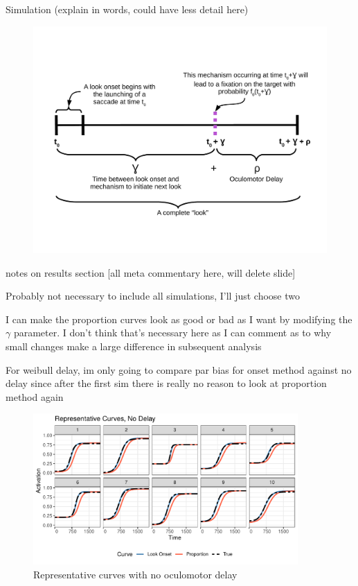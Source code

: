 \documentclass{beamer}
\newcommand{\vp}{\vspace{2mm}}
\begin{document}
\begin{frame}{Simulation (explain in words, could have less detail here)}

\vspace{-2.5mm}
\begin{figure}
\centering
\includegraphics[scale=0.4]{look_comp.pdf}
\end{figure}
\end{frame}

\begin{frame}{notes on results section}
[all meta commentary here, will delete slide] \vp

Probably not necessary to include all simulations, I'll just choose two \vp

I can make the proportion curves look as good or bad as I want by modifying  the $\gamma$ parameter. I don't think that's necessary here as I can comment as to why small changes make a large difference in subsequent analysis \vp

For weibull delay, im only going to compare par bias for onset method against no delay since after the first sim there is really no reason to look at proportion method again
\end{frame}


\begin{frame}
\begin{figure}[H]
\centering
\includegraphics[width=0.9\textwidth]{rep_curves_no_delay.pdf}
\caption{Representative curves with no oculomotor delay}
\label{fig:rep_curves_no_delay}
\end{figure}
\end{frame}
\end{document}
